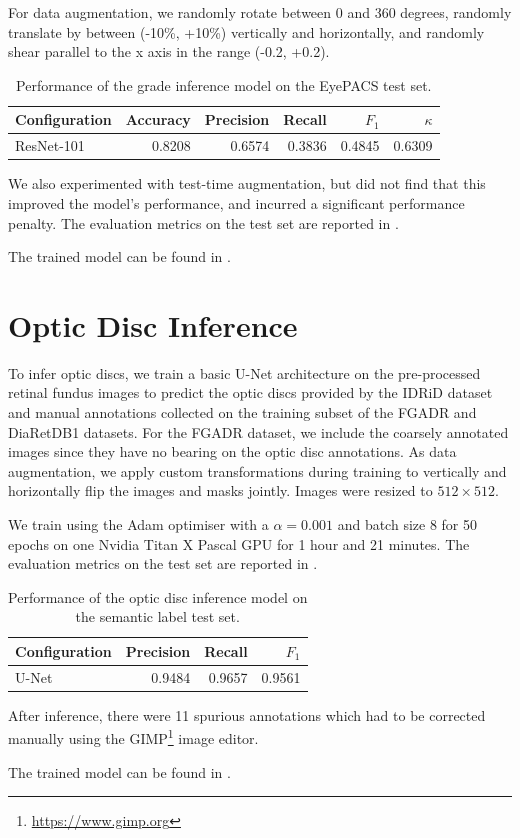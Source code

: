 For data augmentation, we randomly rotate between 0 and 360 degrees, randomly translate by between (-10\%, +10\%) vertically and horizontally, and randomly shear parallel to the x axis in the range (-0.2, +0.2).

\begin{table}[h]
    \centering
    \begin{tabular}{lrrrrr}
        \toprule
        Configuration & Accuracy & Precision & Recall & $F_1$ & $\kappa$ \\
        \midrule
        ResNet-101 & 0.8208 & 0.6574 & 0.3836 & 0.4845 & 0.6309 \\
        \bottomrule
    \end{tabular}
    \caption{Performance of the grade inference model on the EyePACS test set.}
    \label{tab:resnet_results}
\end{table}

We also experimented with test-time augmentation, but did not find that this improved the model's performance, and incurred a significant performance penalty.
The evaluation metrics on the test set are reported in .

The trained model can be found in .

\section{Optic Disc Inference} \label{sec:optic_disc_inference}

To infer optic discs, we train a basic U-Net architecture on the pre-processed retinal fundus images to predict the optic discs provided by the IDRiD dataset and manual annotations collected on the training subset of the FGADR and DiaRetDB1 datasets.
For the FGADR dataset, we include the coarsely annotated images since they have no bearing on the optic disc annotations.
As data augmentation, we apply custom transformations during training to vertically and horizontally flip the images and masks jointly.
Images were resized to $512 \times 512$.

We train using the Adam optimiser with a $\alpha=0.001$ and batch size 8 for 50 epochs on one Nvidia Titan X Pascal GPU for 1 hour and 21 minutes.
The evaluation metrics on the test set are reported in .

\begin{table}[h]
    \centering
    \begin{tabular}{lrrr}
        \toprule
        Configuration & Precision & Recall & $F_1$ \\
        \midrule
        U-Net & 0.9484 & 0.9657 & 0.9561 \\
        \bottomrule
    \end{tabular}
    \caption{Performance of the optic disc inference model on the semantic label test set.}
    \label{tab:od_results}
\end{table}

After inference, there were 11 spurious annotations which had to be corrected manually using the GIMP\footnote{\url{https://www.gimp.org}} image editor.

The trained model can be found in .